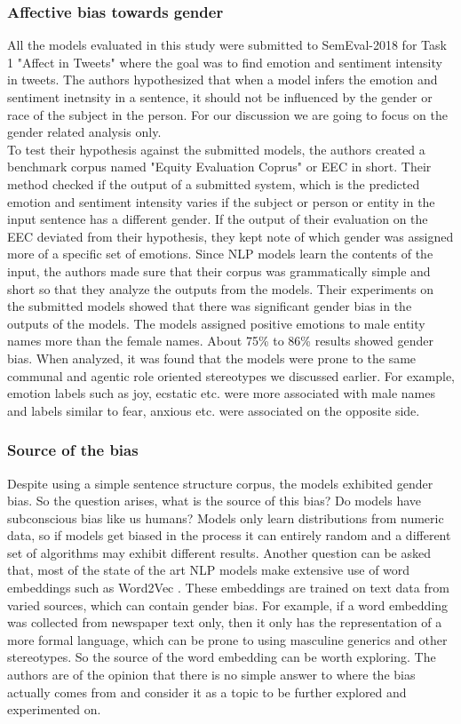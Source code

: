 \documentclass{article}
\begin{document}
\subsubsection*{Affective bias towards gender}

\noindent
All the models evaluated in this study were submitted to SemEval-2018 for Task 1 "Affect in Tweets" where the goal was to find emotion and sentiment intensity in tweets. The authors hypothesized that when a model infers the emotion and sentiment inetnsity in a sentence, it should not be influenced by the gender or race of the subject in the person. For our discussion we are going to focus on the gender related analysis only.  \\

\noindent
To test their hypothesis against the submitted models, the authors created a benchmark corpus named "Equity Evaluation Coprus" or EEC in short. Their method checked if the output of a submitted system, which is the predicted emotion and sentiment intensity varies if the subject or person or entity in the input sentence has a different gender. If the output of their evaluation on the EEC deviated from their hypothesis, they kept note of which gender was assigned more of a specific set of emotions. Since NLP models learn the contents of the input, the authors made sure that their corpus was grammatically simple and short so that they analyze the outputs from the models. Their experiments on the submitted models showed that there was significant gender bias in the outputs of the models. The models assigned positive emotions to male entity names more than the female names. About 75\% to 86\% results showed gender bias. When analyzed, it was found that the models were prone to the same communal and agentic role oriented stereotypes we discussed earlier. For example, emotion labels such as joy, ecstatic etc. were more associated with male names and labels similar to fear, anxious etc. were associated on the opposite side.

\subsubsection*{Source of the bias}
Despite using a simple sentence structure corpus, the models exhibited gender bias. So the question arises, what is the source of this bias? Do models have subconscious bias like us humans? Models only learn distributions from numeric data, so if models get biased in the process it can entirely random and a different set of algorithms may exhibit different results. Another question can be asked that, most of the state of the art NLP models make extensive use of word embeddings such as Word2Vec \cite{mikolov2013efficient}. These embeddings are trained on text data from varied sources, which can contain gender bias. For example, if a word embedding was collected from newspaper text only, then it only has the representation of a more formal language, which can be prone to using masculine generics and other stereotypes. So the source of the word embedding can be worth exploring. The authors are of the opinion that there is no simple answer to where the bias actually comes from and consider it as a topic to be further explored and experimented on.
\end{document}
